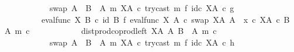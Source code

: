 \begin{isabellebody}
\ \ \ \ \ \ \ \ \ \ \ \ swap\ {\isacharparenleft}{\kern0pt}A\ {\isasymCoprod}\ {\isacharparenleft}{\kern0pt}B\ {\isasymsetminus}\ {\isacharparenleft}{\kern0pt}A{\isacharcomma}{\kern0pt}\ m{\isacharparenright}{\kern0pt}{\isacharparenright}{\kern0pt}{\isacharparenright}{\kern0pt}\ {\isacharparenleft}{\kern0pt}X\isactrlbsup A\isactrlesup {\isacharparenright}{\kern0pt}\ {\isasymcirc}\isactrlsub c\ try{\isacharunderscore}{\kern0pt}cast\ m\ {\isasymtimes}\isactrlsub f\ id\isactrlsub c\ {\isacharparenleft}{\kern0pt}X\isactrlbsup A\isactrlesup {\isacharparenright}{\kern0pt}{\isacharparenright}{\kern0pt}\isactrlsup {\isasymsharp}\ {\isasymcirc}\isactrlsub c\ g{\isacharparenright}{\kern0pt}{\isacharparenright}{\kern0pt}\ {\isacharequal}{\kern0pt}\ \isanewline
\ \ \ \ \ \ \ \ \ \ {\isacharparenleft}{\kern0pt}eval{\isacharunderscore}{\kern0pt}func\ X\ B{\isacharparenright}{\kern0pt}\ {\isasymcirc}\isactrlsub c\ {\isacharparenleft}{\kern0pt}id\ B\ {\isasymtimes}\isactrlsub f\ {\isacharparenleft}{\kern0pt}{\isacharparenleft}{\kern0pt}{\isacharparenleft}{\kern0pt}eval{\isacharunderscore}{\kern0pt}func\ X\ A\ {\isasymcirc}\isactrlsub c\ swap\ {\isacharparenleft}{\kern0pt}X\isactrlbsup A\isactrlesup {\isacharparenright}{\kern0pt}\ A{\isacharparenright}{\kern0pt}\ {\isasymamalg}\ {\isacharparenleft}{\kern0pt}x\ {\isasymcirc}\isactrlsub c\ {\isasymbeta}\isactrlbsub X\isactrlbsup A\isactrlesup \ {\isasymtimes}\isactrlsub c\ {\isacharparenleft}{\kern0pt}B\ {\isasymsetminus}\ {\isacharparenleft}{\kern0pt}A{\isacharcomma}{\kern0pt}\ m{\isacharparenright}{\kern0pt}{\isacharparenright}{\kern0pt}\isactrlesub {\isacharparenright}{\kern0pt}\ {\isasymcirc}\isactrlsub c\isanewline
\ \ \ \ \ \ \ \ \ \ \ \ dist{\isacharunderscore}{\kern0pt}prod{\isacharunderscore}{\kern0pt}coprod{\isacharunderscore}{\kern0pt}left\ {\isacharparenleft}{\kern0pt}X\isactrlbsup A\isactrlesup {\isacharparenright}{\kern0pt}\ A\ {\isacharparenleft}{\kern0pt}B\ {\isasymsetminus}\ {\isacharparenleft}{\kern0pt}A{\isacharcomma}{\kern0pt}\ m{\isacharparenright}{\kern0pt}{\isacharparenright}{\kern0pt}\ {\isasymcirc}\isactrlsub c\isanewline
\ \ \ \ \ \ \ \ \ \ \ \ swap\ {\isacharparenleft}{\kern0pt}A\ {\isasymCoprod}\ {\isacharparenleft}{\kern0pt}B\ {\isasymsetminus}\ {\isacharparenleft}{\kern0pt}A{\isacharcomma}{\kern0pt}\ m{\isacharparenright}{\kern0pt}{\isacharparenright}{\kern0pt}{\isacharparenright}{\kern0pt}\ {\isacharparenleft}{\kern0pt}X\isactrlbsup A\isactrlesup {\isacharparenright}{\kern0pt}\ {\isasymcirc}\isactrlsub c\ try{\isacharunderscore}{\kern0pt}cast\ m\ {\isasymtimes}\isactrlsub f\ id\isactrlsub c\ {\isacharparenleft}{\kern0pt}X\isactrlbsup A\isactrlesup {\isacharparenright}{\kern0pt}{\isacharparenright}{\kern0pt}\isactrlsup {\isasymsharp}\ {\isasymcirc}\isactrlsub c\ h{\isacharparenright}{\kern0pt}{\isacharparenright}{\kern0pt}{\isachardoublequoteclose}\isanewline

\end{isabellebody}
